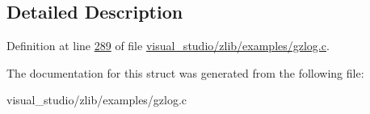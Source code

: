 \subsection{Detailed Description}


Definition at line \hyperlink{visual__studio_2zlib_2examples_2gzlog_8c_source_l00289}{289} of file \hyperlink{visual__studio_2zlib_2examples_2gzlog_8c_source}{visual\+\_\+studio/zlib/examples/gzlog.\+c}.



The documentation for this struct was generated from the following file\+:\begin{DoxyCompactItemize}
\item 
visual\+\_\+studio/zlib/examples/gzlog.\+c\end{DoxyCompactItemize}
